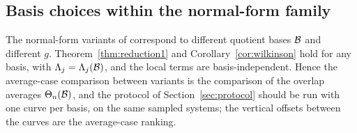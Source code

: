 \subsection{Basis choices within the normal-form family}

The normal-form variants of \cite{graf2026numerical,telen2018stabilized} correspond to
different quotient bases $\mathcal{B}$ and different $g$. Theorem~\ref{thm:reduction1} and
Corollary~\ref{cor:wilkinson} hold for any basis, with $\Lambda_j = \Lambda_j(\mathcal{B})$, and
the local terms are basis-independent. Hence the average-case comparison between variants
is the comparison of the overlap averages $\Theta_n(\mathcal{B})$, and the protocol of
Section~\ref{sec:protocol} should be run with one curve per basis, on the same sampled
systems; the vertical offsets between the curves are the average-case ranking.
